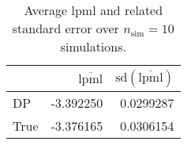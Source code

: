 \begin{table}[H]

\caption{Average lpml and related standard error over $n_{\text{sim}} = 10$ simulations.}
\centering
\begin{tabular}[t]{lrr}
\toprule
  & $\overbar{\text{lpml}}$ & $\text{sd}(\overbar{\text{lpml}})$\\
\midrule
DP & -3.392250 & 0.0299287\\
True & -3.376165 & 0.0306154\\
\bottomrule
\end{tabular}
\end{table}